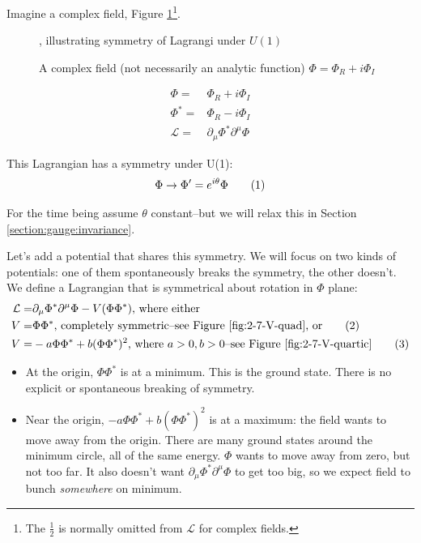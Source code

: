 \documentclass[]{article}
\newcommand\numberthis{\addtocounter{equation}{1}\tag{\theequation}}
\begin{document}
Imagine a complex field, Figure \ref{fig:2-7-complex-phi}\footnote{The $\frac{1}{2}$ is normally omitted from $\mathcal{L}$ for complex fields.}.

\begin{figure}[H]
	\begin{center}
		\caption[A complex field $\Phi = \Phi_R + i \Phi_I$]{A complex field (not necessarily an analytic function) $\Phi = \Phi_R + i \Phi_I$}, illustrating symmetry of Lagrangi under $U(1)$\label{fig:2-7-complex-phi}
	\end{center}
\end{figure}

\begin{align*}
	\Phi =& \Phi_R + i \Phi_I \\
	\Phi^* =& \Phi_R - i \Phi_I\\
	\mathcal{L} =&  \partial_\mu \Phi^* \partial^\mu \Phi 
\end{align*}

This Lagrangian has a symmetry under U(1):
\begin{align*}
	\Phi \rightarrow \Phi^\prime=e^{i \theta} \Phi  \numberthis \label{eq:U1:theta}
\end{align*}

For the time being assume $\theta$ constant--but we will relax this in Section \ref{section:gauge:invariance}.

Let's add a potential that shares this symmetry. We will focus on two kinds of potentials: one of them spontaneously breaks the symmetry, the other doesn't. We define a Lagrangian that is symmetrical about rotation in $\Phi$ plane:
\begin{align*}
	\mathcal{L} =&  \partial_\mu \Phi^* \partial^\mu \Phi -V(\Phi \Phi^*) \text{, where either}\\
	V =& \Phi \Phi^* \text{, completely symmetric--see Figure \ref{fig:2-7-V-quad}, or} \numberthis \label{eq:symmetric}\\
	V=& -a \Phi \Phi^* + b (\Phi \Phi^*)^2 \text{, where $a>0,b>0$--see Figure \ref{fig:2-7-V-quartic}} \numberthis \label{eq:breakable:symmetric}
\end{align*}

\begin{itemize}
	\item At the origin, $\Phi \Phi^*$  is at a minimum. This is the ground state. There is no explicit or spontaneous breaking of symmetry.
	\item Near the origin, $-a \Phi \Phi^* + b (\Phi \Phi^*)^2$ is at a maximum: the field wants to move away from the origin. There are many ground states around the minimum circle, all of the same energy. $\Phi$ wants to move away from zero, but not too far. It also doesn't want $\partial_\mu \Phi^* \partial^\mu \Phi$ to get too big, so we expect field to bunch \emph{somewhere} on minimum.
\end{itemize}
\end{document}
